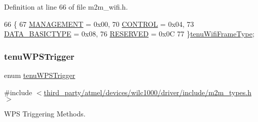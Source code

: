 Definition at line 66 of file m2m\+\_\+wifi.\+h.


\begin{DoxyCode}
66              \{
67     \hyperlink{group__WlanEnums_gga593eb9b713b71fcc9cae6e81393b40d9a6882ae19eda3dcf275595670d49d709e}{MANAGEMENT}            = 0x00,
70     \hyperlink{group__WlanEnums_gga593eb9b713b71fcc9cae6e81393b40d9af722a5faa36087c914da53ebe4711f08}{CONTROL}               = 0x04,
73     \hyperlink{group__WlanEnums_gga593eb9b713b71fcc9cae6e81393b40d9a297b5ad5452f3000106b51741f65aee9}{DATA\_BASICTYPE}        = 0x08,
76     \hyperlink{group__WlanEnums_gga593eb9b713b71fcc9cae6e81393b40d9afe4c21755babfece7188666f75c7386b}{RESERVED}              = 0x0C
77 \}\hyperlink{group__WlanEnums_ga593eb9b713b71fcc9cae6e81393b40d9}{tenuWifiFrameType};
\end{DoxyCode}
\mbox{\label{group__WlanEnums_ga5bbde63fb908694883507ec7295f74f6}} 
\subsubsection{\texorpdfstring{tenu\+W\+P\+S\+Trigger}{tenuWPSTrigger}}
{\footnotesize\ttfamily enum \hyperlink{group__WlanEnums_ga5bbde63fb908694883507ec7295f74f6}{tenu\+W\+P\+S\+Trigger}}



{\ttfamily \#include $<$\hyperlink{m2m__types_8h}{third\+\_\+party/atmel/devices/wilc1000/driver/include/m2m\+\_\+types.\+h}$>$}



W\+PS Triggering Methods. 

